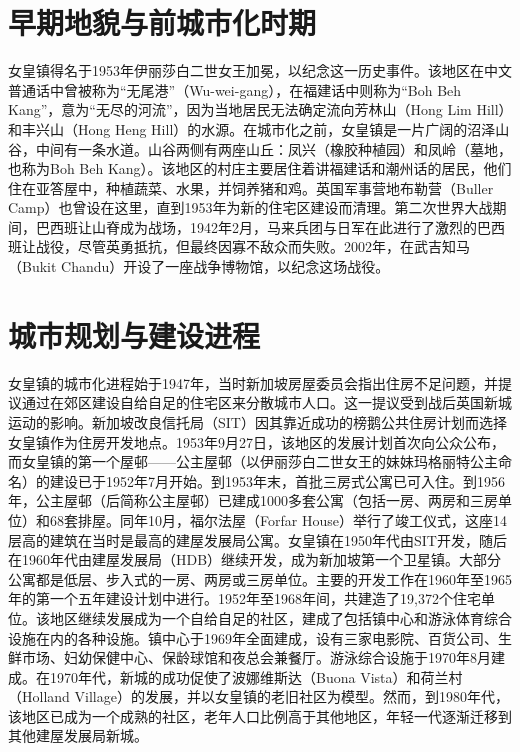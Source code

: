 \documentclass[11pt,a4paper,twoside,openany]{book}
\begin{document}
\section{早期地貌与前城市化时期}
女皇镇得名于1953年伊丽莎白二世女王加冕，以纪念这一历史事件。该地区在中文普通话中曾被称为“无尾港”（Wu-wei-gang），在福建话中则称为“Boh Beh Kang”，意为“无尽的河流”，因为当地居民无法确定流向芳林山（Hong Lim Hill）和丰兴山（Hong Heng Hill）的水源。在城市化之前，女皇镇是一片广阔的沼泽山谷，中间有一条水道。山谷两侧有两座山丘：凤兴（橡胶种植园）和凤岭（墓地，也称为Boh Beh Kang）。该地区的村庄主要居住着讲福建话和潮州话的居民，他们住在亚答屋中，种植蔬菜、水果，并饲养猪和鸡。英国军事营地布勒营（Buller Camp）也曾设在这里，直到1953年为新的住宅区建设而清理。第二次世界大战期间，巴西班让山脊成为战场，1942年2月，马来兵团与日军在此进行了激烈的巴西班让战役，尽管英勇抵抗，但最终因寡不敌众而失败。2002年，在武吉知马（Bukit Chandu）开设了一座战争博物馆，以纪念这场战役。

\section{城市规划与建设进程}
女皇镇的城市化进程始于1947年，当时新加坡房屋委员会指出住房不足问题，并提议通过在郊区建设自给自足的住宅区来分散城市人口。这一提议受到战后英国新城运动的影响。新加坡改良信托局（SIT）因其靠近成功的榜鹅公共住房计划而选择女皇镇作为住房开发地点。1953年9月27日，该地区的发展计划首次向公众公布，而女皇镇的第一个屋邨——公主屋邨（以伊丽莎白二世女王的妹妹玛格丽特公主命名）的建设已于1952年7月开始。到1953年末，首批三房式公寓已可入住。到1956年，公主屋邨（后简称公主屋邨）已建成1000多套公寓（包括一房、两房和三房单位）和68套排屋。同年10月，福尔法屋（Forfar House）举行了竣工仪式，这座14层高的建筑在当时是最高的建屋发展局公寓。女皇镇在1950年代由SIT开发，随后在1960年代由建屋发展局（HDB）继续开发，成为新加坡第一个卫星镇。大部分公寓都是低层、步入式的一房、两房或三房单位。主要的开发工作在1960年至1965年的第一个五年建设计划中进行。1952年至1968年间，共建造了19,372个住宅单位。该地区继续发展成为一个自给自足的社区，建成了包括镇中心和游泳体育综合设施在内的各种设施。镇中心于1969年全面建成，设有三家电影院、百货公司、生鲜市场、妇幼保健中心、保龄球馆和夜总会兼餐厅。游泳综合设施于1970年8月建成。在1970年代，新城的成功促使了波娜维斯达（Buona Vista）和荷兰村（Holland Village）的发展，并以女皇镇的老旧社区为模型。然而，到1980年代，该地区已成为一个成熟的社区，老年人口比例高于其他地区，年轻一代逐渐迁移到其他建屋发展局新城。
\end{document}
